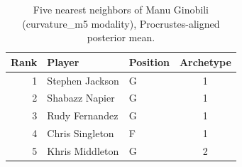 \begin{table}[htbp]
  \centering\small
  \begin{tabular}{rllc}
    \toprule
    Rank & Player & Position & Archetype \\
    \midrule
    1 & Stephen Jackson & G & 1 \\
    2 & Shabazz Napier & G & 1 \\
    3 & Rudy Fernandez & G & 1 \\
    4 & Chris Singleton & F & 1 \\
    5 & Khris Middleton & G & 2 \\
    \bottomrule
  \end{tabular}
  \caption{Five nearest neighbors of Manu Ginobili (curvature_m5 modality), Procrustes-aligned posterior mean.}
  \label{tab:Manu_Ginobili_neighbors_curvature_m5}
\end{table}

